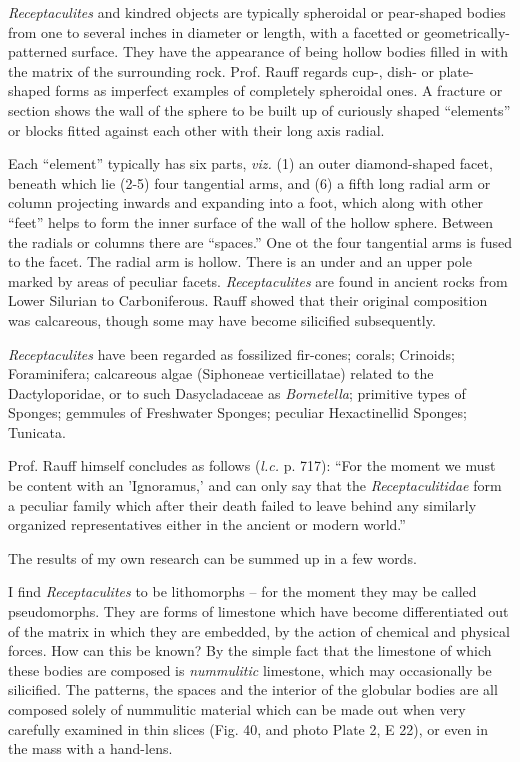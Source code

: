 \documentclass[a4paper, 12pt, oneside]{article}
\begin{document}
\emph{Receptaculites} and kindred objects are typically spheroidal or pear-shaped bodies from one to several inches in diameter or length, with a facetted or geometrically-patterned surface. They have the appearance of being hollow bodies filled in with the matrix of the surrounding rock. Prof. Rauff regards cup-, dish- or plate-shaped forms as imperfect examples of completely spheroidal ones. A fracture or section shows the wall of the sphere to be built up of curiously shaped ``elements'' or blocks fitted against each other with their long axis radial.

Each ``element'' typically has six parts, \emph{viz.} (1) an outer diamond-shaped facet, beneath which lie (2-5) four tangential arms, and (6) a fifth long radial arm or column projecting inwards and expanding into a foot, which along with other ``feet'' helps to form the inner surface of the wall of the hollow sphere. Between the radials or columns there are ``spaces.'' One ot the four tangential arms is fused to the facet. The radial arm is hollow. There is an under and an upper pole marked by areas of peculiar facets. \emph{Receptaculites} are found in ancient rocks from Lower Silurian to Carboniferous. Rauff showed that their original composition was calcareous, though some may have become silicified subsequently.

\emph{Receptaculites} have been regarded as fossilized fir-cones; corals; Crinoids; Foraminifera; calcareous algae (Siphoneae verticillatae) related to the Dactyloporidae, or to such Dasycladaceae as \emph{Bornetella}; primitive types of Sponges; gemmules of Freshwater Sponges; peculiar Hexactinellid Sponges; Tunicata.

Prof. Rauff himself concludes as follows (\emph{l.c.} p. 717): ``For the moment we must be content with an 'Ignoramus,' and can only say that the \emph{Receptaculitidae} form a peculiar family which after their death failed to leave behind any similarly organized representatives either in the ancient or modern world.''

The results of my own research can be summed up in a few words.

I find \emph{Receptaculites} to be lithomorphs -- for the moment they may be called pseudomorphs. They are forms of limestone which have become differentiated out of the matrix in which they are embedded, by the action of chemical and physical forces. How can this be known? By the simple fact that the limestone of which these bodies are composed is \emph{nummulitic} limestone, which may occasionally be silicified. The patterns, the spaces and the interior of the globular bodies are all composed solely of nummulitic material which can be made out when very carefully examined in thin slices (Fig. 40, and photo Plate 2, E 22), or even in the mass with a hand-lens.
\end{document}
